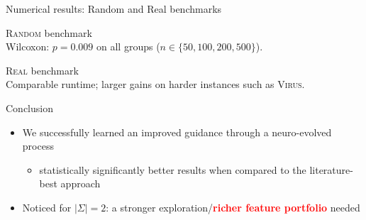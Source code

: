 \documentclass{beamer}
\begin{document}
\begin{frame}{Numerical results: Random and Real benchmarks}
 
\begin{block}{\textsc{Random} benchmark}
\centering
{} \\
\vspace{0.15cm}
\footnotesize Wilcoxon: $p=0.009$ on all groups ($n\in\{50, 100, 200, 500\}$).
\end{block}


\begin{block}{\textsc{Real} benchmark}
\centering
{} \\
\vspace{0.7cm}
\footnotesize{Comparable runtime; larger gains on harder instances such as \textsc{Virus}}.
\end{block}

 
\end{frame}


\begin{frame}{Conclusion}


		\begin{itemize}
			\item 	We successfully learned an improved guidance  through a neuro-evolved process
			\begin{itemize}
				\item statistically significantly better results when compared to the literature-best approach
			\end{itemize} \vspace{0.5cm}
		    \item Noticed for $|\Sigma|=2$: a stronger exploration/\textcolor{red}{\textbf{richer feature portfolio}} needed
		\end{itemize}

\end{frame}
\end{document}
